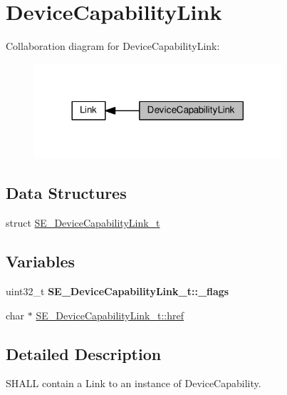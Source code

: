 \hypertarget{group__DeviceCapabilityLink}{}\section{Device\+Capability\+Link}
\label{group__DeviceCapabilityLink}
Collaboration diagram for Device\+Capability\+Link\+:\nopagebreak
\begin{figure}[H]
\begin{center}
\leavevmode
\includegraphics[width=260pt]{group__DeviceCapabilityLink}
\end{center}
\end{figure}
\subsection*{Data Structures}
\begin{DoxyCompactItemize}
\item 
struct \hyperlink{structSE__DeviceCapabilityLink__t}{S\+E\+\_\+\+Device\+Capability\+Link\+\_\+t}
\end{DoxyCompactItemize}
\subsection*{Variables}
\begin{DoxyCompactItemize}
\item 
\mbox{\label{group__DeviceCapabilityLink_ga67ac1b6b84ef597da11e0cd34ab689b6}} 
uint32\+\_\+t {\bfseries S\+E\+\_\+\+Device\+Capability\+Link\+\_\+t\+::\+\_\+flags}
\item 
char $\ast$ \hyperlink{group__DeviceCapabilityLink_ga71815602af62f0ca2267bff4d8c960e1}{S\+E\+\_\+\+Device\+Capability\+Link\+\_\+t\+::href}
\end{DoxyCompactItemize}


\subsection{Detailed Description}
S\+H\+A\+LL contain a Link to an instance of Device\+Capability. 

